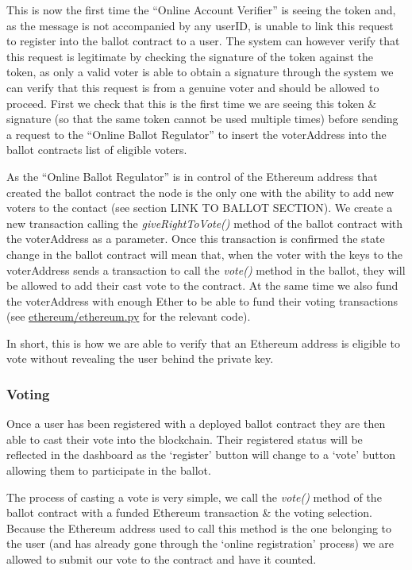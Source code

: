 \documentclass{article}
\begin{document}
This is now the first time the ``Online Account Verifier'' is seeing the token and, as the message is not accompanied by any userID, is unable to link this request to register into the ballot contract to a user. The system can however verify that this request is legitimate by checking the signature of the token against the token, as only a valid voter is able to obtain a signature through the system we can verify that this request is from a genuine voter and should be allowed to proceed. First we check that this is the first time we are seeing this token \& signature (so that the same token cannot be used multiple times) before sending a request to the ``Online Ballot Regulator'' to insert the voterAddress into the ballot contracts list of eligible voters.

As the ``Online Ballot Regulator'' is in control of the Ethereum address that created the ballot contract the node is the only one with the ability to add new voters to the contact (see section {\Large LINK TO BALLOT SECTION}). We create a new transaction calling the \textit{giveRightToVote()} method of the ballot contract with the voterAddress as a parameter. Once this transaction is confirmed the state change in the ballot contract will mean that, when the voter with the keys to the voterAddress sends a transaction to call the \textit{vote()} method in the ballot, they will be allowed to add their cast vote to the contract. At the same time we also fund the voterAddress with enough Ether to be able to fund their voting transactions (see \href{https://github.com/Mattie432/Blockchain-Voting-System/blob/master/Programming/4_OnlineBallotRegulator/ethereum/ethereum.py#L145}{ethereum/ethereum.py} for the relevant code).

In short, this is how we are able to verify that an Ethereum address is eligible to vote without revealing the user behind the private key.

\cleardoublepage
\subsubsection{Voting}
Once a user has been registered with a deployed ballot contract they are then able to cast their vote into the blockchain. Their registered status will be reflected in the dashboard as the `register' button will change to a `vote' button allowing them to participate in the ballot.

The process of casting a vote is very simple, we call the \textit{vote()} method of the ballot contract with a funded Ethereum transaction \& the voting selection. Because the Ethereum address used to call this method is the one belonging to the user (and has already gone through the `online registration' process) we are allowed to submit our vote to the contract and have it counted.
\end{document}
